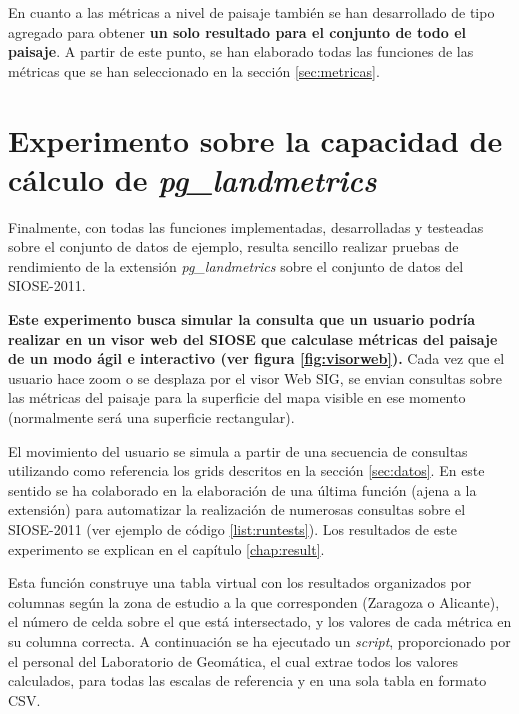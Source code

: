 \label{list:tca3}

En cuanto a las métricas a nivel de paisaje también se han desarrollado de tipo agregado para obtener \textbf{un solo resultado para el conjunto de todo el paisaje}. A partir de este punto, se han elaborado todas las funciones de las métricas que se han seleccionado en la sección \ref{sec:metricas}.

\section{Experimento sobre la capacidad de cálculo de \textit{pg\_landmetrics}\label{sec:exp}}

Finalmente, con todas las funciones implementadas, desarrolladas y testeadas sobre el conjunto de datos de ejemplo, resulta sencillo realizar pruebas de rendimiento de la extensión \textit{pg\_landmetrics} sobre el conjunto de datos del SIOSE-2011.

\textbf{Este experimento busca simular la consulta que un usuario podría realizar en un visor web del SIOSE que calculase métricas del paisaje de un modo ágil e interactivo (ver figura \ref{fig:visorweb}).} Cada vez que el usuario hace zoom o se desplaza por el visor Web SIG, se envian consultas sobre las métricas del paisaje para la superficie del mapa visible en ese momento (normalmente será una superficie rectangular). 

El movimiento del usuario se simula a partir de una secuencia de consultas utilizando como referencia los grids descritos en la sección \ref{sec:datos}. En este sentido se ha colaborado en la elaboración de una última función (ajena a la extensión) para automatizar la realización de numerosas consultas sobre el SIOSE-2011 (ver ejemplo de código \ref{list:runtests}). Los resultados de este experimento se explican en el capítulo \ref{chap:result}.

\label{list:runtests}

Esta función construye una tabla virtual con los resultados organizados por columnas según la zona de estudio a la que corresponden (Zaragoza o Alicante), el número de celda sobre el que está intersectado, y los valores de cada métrica en su columna correcta. A continuación se ha ejecutado un \textit{script}, proporcionado por el personal del Laboratorio de Geomática, el cual extrae todos los valores calculados, para todas las escalas de referencia y en una sola tabla en formato CSV.


